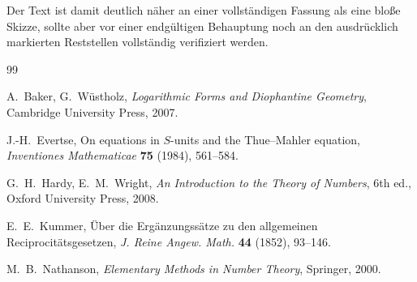 \documentclass[12pt,a4paper]{article}
\theoremstyle{plain}
\theoremstyle{definition}
\theoremstyle{remark}
\begin{document}
	Der Text ist damit deutlich näher an einer vollständigen Fassung als eine bloße Skizze, sollte aber vor einer endgültigen Behauptung noch an den ausdrücklich markierten Reststellen vollständig verifiziert werden.
	
	\begin{thebibliography}{99}
		
		A.~Baker, G.~Wüstholz,
		\emph{Logarithmic Forms and Diophantine Geometry},
		Cambridge University Press, 2007.
		
		J.-H.~Evertse,
		On equations in \(S\)-units and the Thue--Mahler equation,
		\emph{Inventiones Mathematicae} \textbf{75} (1984), 561--584.
		
		G.~H.~Hardy, E.~M.~Wright,
		\emph{An Introduction to the Theory of Numbers},
		6th ed., Oxford University Press, 2008.
		
		E.~E.~Kummer,
		Über die Ergänzungssätze zu den allgemeinen Reciprocitätsgesetzen,
		\emph{J. Reine Angew. Math.} \textbf{44} (1852), 93--146.
		
		M.~B.~Nathanson,
		\emph{Elementary Methods in Number Theory},
		Springer, 2000.
		
	\end{thebibliography}
	
\end{document}
